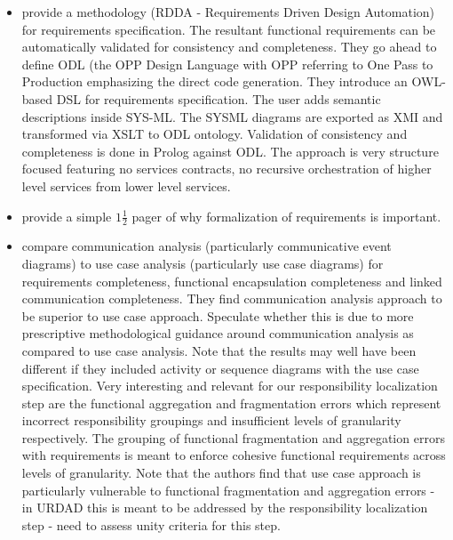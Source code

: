 \begin{itemize}
   \item \cite{cardei_model_2008} provide a methodology (RDDA - Requirements Driven Design Automation) for requirements specification. The resultant functional requirements can be automatically validated for consistency and completeness. They go ahead to define ODL (the OPP Design Language with OPP referring to One Pass to Production emphasizing the direct code generation. They introduce an OWL-based DSL for requirements specification. The user adds semantic descriptions inside SYS-ML. The SYSML diagrams are exported as XMI and transformed via XSLT to ODL ontology. Validation of consistency and completeness is done in Prolog against ODL. The approach is very structure focused featuring no services contracts, no recursive orchestration of higher level services from lower level services.
   \item \cite{parnas_requirements_2000} provide a simple $1\frac{1}{2}$ pager of why formalization of requirements is important.
   \item \cite{espana_evaluating_2009} compare communication analysis (particularly communicative event diagrams) to use case analysis (particularly use case diagrams) for requirements completeness, functional encapsulation completeness and linked communication completeness. They find communication analysis approach to be superior to use case approach. Speculate whether this is due to more prescriptive methodological guidance around communication analysis as compared to use case analysis. Note that the results may well have been different if they included activity or sequence diagrams with the use case specification. Very interesting and relevant for our responsibility localization step are the functional aggregation and fragmentation errors which represent incorrect responsibility groupings and insufficient levels of granularity respectively. The grouping of functional fragmentation and aggregation errors with requirements is meant to enforce cohesive functional requirements across levels of granularity. Note that the authors find that use case approach is particularly vulnerable to functional fragmentation and aggregation errors - in URDAD this is meant to be addressed by the responsibility localization step - need to assess unity criteria for this step.
  \end{itemize}


